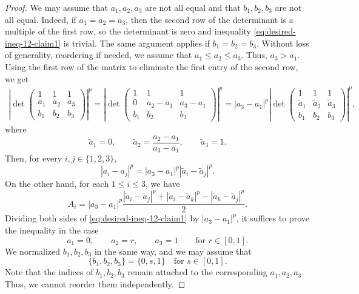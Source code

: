 \documentclass[11pt,a4paper]{amsart}
\theoremstyle{plain}
\theoremstyle{definition}
\begin{document}
\begin{proof}
    We may assume that $a_1,a_2,a_3$ are not all equal and that $b_1,b_2,b_3$ are not all equal. Indeed, if $a_1 =a_2=a_3$, then the second row of the determinant is a multiple of the first row, so the determinant is zero and inequality \eqref{eq:desired-ineq-12-claim1} is trivial. The same argument applies if $b_1=b_2=b_3$. 
    Without loss of generality, reordering if needed, we assume that $a_1 \leq a_2 \leq a_3$. Thus, $a_3 > a_1$. Using the first row of the matrix to eliminate the first entry of the second row, we get
        \begin{align}
            \left|\operatorname{det}\!\!\left(\begin{array}{ccc}1 & 1 & 1 \\ a_1 & a_2 & a_3 \\ b_1 & b_2 & b_3\end{array}\right)\right|^p \!\!  
            = \left|\operatorname{det}\!\!\left(\begin{array}{ccc}1 & 1 & 1 \\ 0 & a_2-a_1 & a_3-a_1 \\ b_1 & b_2 & b_3\end{array}\right)\right|^p 
            \!\!\!= |a_3 -a_1|^p \left|\operatorname{det}\!\!\left(\begin{array}{ccc}1 & 1 & 1 \\ \tilde a_1 &\tilde a_2 & \tilde a_3 \\ b_1 & b_2 & b_3\end{array}\right)\right|^p\!\!\!,
        \end{align}
        where 
        \[
            \tilde a_1=0,\qquad \tilde a_2=\frac{a_2-a_1}{a_3-a_1},\qquad \tilde a_3=1.
        \]
        Then, for every $i, j \in\{1,2,3\}$,
        $$
        \left|a_i-a_j\right|^p=\left|a_3-a_1\right|^p\left|\widetilde{a}_i-\widetilde{a}_j\right|^p .
        $$
        On the other hand, for each  $1\leq i \leq 3$, we have 
        \[
            A_i = |a_3 -a_1|^p \frac{| \tilde a_i - \tilde a_j|^p + |\tilde a_i - \tilde a_k|^p - | \tilde a_k - \tilde a_j|^p}{2}.
        \]
        Dividing both sides of \eqref{eq:desired-ineq-12-claim1} by $|a_3 -a_1|^p$, it suffices to prove the inequality in the case
        \[
            a_1 = 0, \qquad a_2 = r, \qquad a_3 =1\qquad \text{for } r \in [0,1].
        \]
        We normalized $b_1,b_2,b_3$ in the same way, and we may assume that
        \[
            \{ b_1,b_2,b_3\} = \{ 0,s,1\} \quad \text{for } s \in [0,1].
        \]
        Note that the indices of $b_1,b_2,b_3$ remain attached to the corresponding $a_1,a_2,a_3$. Thus, we cannot reorder them independently. 

\end{proof}
\end{document}
